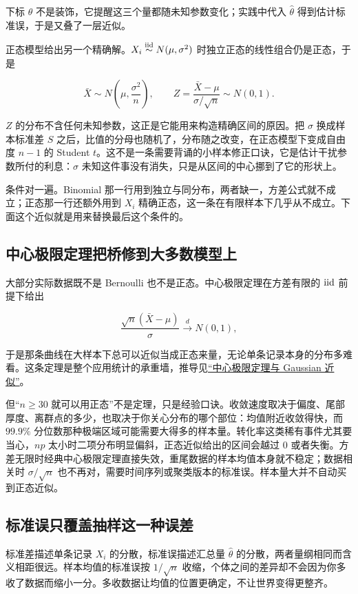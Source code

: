 下标 \(\theta\) 不是装饰，它提醒这三个量都随未知参数变化；实践中代入 \(\hat\theta\) 得到估计标准误，于是又叠了一层近似。

正态模型给出另一个精确解。\(X_i\overset{\mathrm{iid}}{\sim}N(\mu,\sigma^2)\) 时独立正态的线性组合仍是正态，于是

\[
\bar X\sim N\!\left(\mu,\frac{\sigma^2}n\right),
\qquad
Z=\frac{\bar X-\mu}{\sigma/\sqrt n}\sim N(0,1).
\]

\(Z\) 的分布不含任何未知参数，这正是它能用来构造精确区间的原因。把 \(\sigma\) 换成样本标准差 \(S\) 之后，比值的分母也随机了，分布随之改变，在正态模型下变成自由度 \(n-1\) 的 Student \(t\)。这不是一条需要背诵的小样本修正口诀，它是估计干扰参数所付的利息：\(\sigma\) 未知这件事没有消失，只是从区间的中心挪到了它的形状上。

条件对一遍。Binomial 那一行用到独立与同分布，两者缺一，方差公式就不成立；正态那一行还额外用到 \(X_i\) 精确正态，这一条在有限样本下几乎从不成立。下面这个近似就是用来替换最后这个条件的。

\subsection{中心极限定理把桥修到大多数模型上}

大部分实际数据既不是 Bernoulli 也不是正态。中心极限定理在方差有限的 \(\mathrm{iid}\) 前提下给出

\[
\frac{\sqrt n(\bar X-\mu)}{\sigma}\overset{d}{\longrightarrow}N(0,1),
\]

于是那条曲线在大样本下总可以近似当成正态来量，无论单条记录本身的分布多难看。这条定理是整个应用统计的承重墙，推导见\hyperref[sec:05-Probability/08-Limit-Theorems/03]{``中心极限定理与 Gaussian 近似''}。

但``\(n\ge30\) 就可以用正态''不是定理，只是经验口诀。收敛速度取决于偏度、尾部厚度、离群点的多少，也取决于你关心分布的哪个部位：均值附近收敛得快，而 \(99.9\%\) 分位数那种极端区域可能需要大得多的样本量。转化率这类稀有事件尤其要当心，\(np\) 太小时二项分布明显偏斜，正态近似给出的区间会越过 0 或者失衡。方差无限时经典中心极限定理直接失效，重尾数据的样本均值本身就不稳定；数据相关时 \(\sigma/\sqrt n\) 也不再对，需要时间序列或聚类版本的标准误。样本量大并不自动买到正态近似。

\subsection{标准误只覆盖抽样这一种误差}

标准差描述单条记录 \(X_i\) 的分散，标准误描述汇总量 \(\hat\theta\) 的分散，两者量纲相同而含义相距很远。样本均值的标准误按 \(1/\sqrt n\) 收缩，个体之间的差异却不会因为你多收了数据而缩小一分。多收数据让均值的位置更确定，不让世界变得更整齐。

